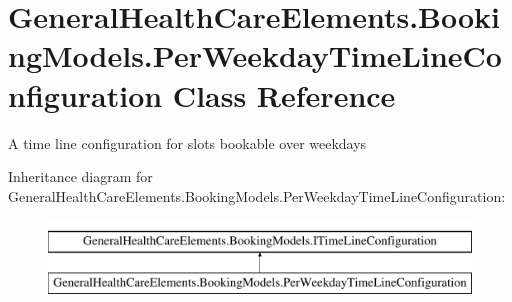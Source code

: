 \hypertarget{class_general_health_care_elements_1_1_booking_models_1_1_per_weekday_time_line_configuration}{}\section{General\+Health\+Care\+Elements.\+Booking\+Models.\+Per\+Weekday\+Time\+Line\+Configuration Class Reference}
\label{class_general_health_care_elements_1_1_booking_models_1_1_per_weekday_time_line_configuration}


A time line configuration for slots bookable over weekdays  


Inheritance diagram for General\+Health\+Care\+Elements.\+Booking\+Models.\+Per\+Weekday\+Time\+Line\+Configuration\+:\begin{figure}[H]
\begin{center}
\leavevmode
\includegraphics[height=2.000000cm]{class_general_health_care_elements_1_1_booking_models_1_1_per_weekday_time_line_configuration}
\end{center}
\end{figure}
